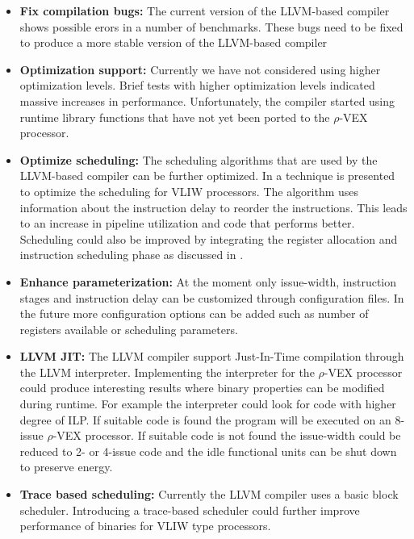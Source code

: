 \begin{itemize}
	\item \textbf{Fix compilation bugs:}  The current version of the LLVM-based compiler shows possible erors in a number of benchmarks. These bugs need to be fixed to produce a more stable version of the LLVM-based compiler

	\item \textbf{Optimization support:} Currently we have not considered using higher optimization levels. Brief tests with higher optimization levels indicated massive increases in performance. Unfortunately, the compiler started using runtime library functions that have not yet been ported to the $\rho$-VEX processor.

	\item \textbf{Optimize scheduling:} The scheduling algorithms that are used by the LLVM-based compiler can be further optimized. In \cite{Vahedi:2013mz} a technique is presented to optimize the scheduling for VLIW processors. The algorithm uses information about the instruction delay to reorder the instructions. This leads to an increase in pipeline utilization and code that performs better. Scheduling could also be improved by integrating the register allocation and instruction scheduling phase as discussed in \cite{Bradlee:1991:IRA:106973.106986}. 

	\item \textbf{Enhance parameterization:} At the moment only issue-width, instruction stages and instruction delay can be customized through configuration files. In the future more configuration options can be added such as number of registers available or scheduling parameters.

	\item \textbf{LLVM JIT:} The LLVM compiler support Just-In-Time compilation through the LLVM interpreter. Implementing the interpreter for the $\rho$-VEX processor could produce interesting results where binary properties can be modified during runtime. For example the interpreter could look for code with higher degree of ILP. If suitable code is found the program will be executed on an 8-issue $\rho$-VEX processor. If suitable code is not found the issue-width could be reduced to 2- or 4-issue code and the idle functional units can be shut down to preserve energy.

	\item \textbf{Trace based scheduling:} Currently the LLVM compiler uses a basic block scheduler. Introducing a trace-based scheduler could further improve performance of binaries for VLIW type processors.

\end{itemize}

\acresetall
